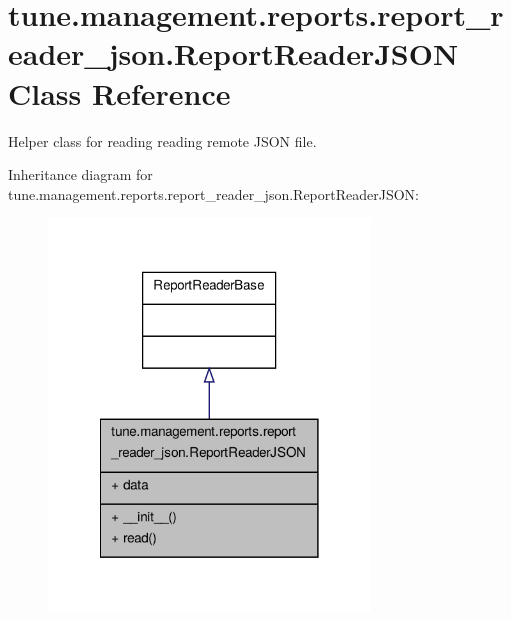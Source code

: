 \hypertarget{classtune_1_1management_1_1reports_1_1report__reader__json_1_1ReportReaderJSON}{\section{tune.\-management.\-reports.\-report\-\_\-reader\-\_\-json.\-Report\-Reader\-J\-S\-O\-N Class Reference}
\label{classtune_1_1management_1_1reports_1_1report__reader__json_1_1ReportReaderJSON}
}


Helper class for reading reading remote J\-S\-O\-N file.  




Inheritance diagram for tune.\-management.\-reports.\-report\-\_\-reader\-\_\-json.\-Report\-Reader\-J\-S\-O\-N\-:
\nopagebreak
\begin{figure}[H]
\begin{center}
\leavevmode
\includegraphics[width=242pt]{classtune_1_1management_1_1reports_1_1report__reader__json_1_1ReportReaderJSON__inherit__graph}
\end{center}
\end{figure}


